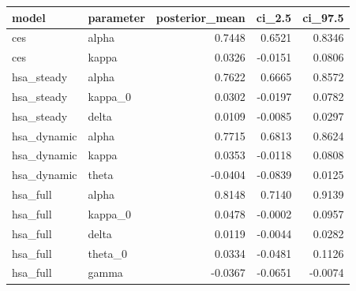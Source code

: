 \begin{tabular}{llrrr}
\toprule
model & parameter & posterior\_mean & ci\_2.5 & ci\_97.5 \\
\midrule
ces & alpha & 0.7448 & 0.6521 & 0.8346 \\
ces & kappa & 0.0326 & -0.0151 & 0.0806 \\
hsa\_steady & alpha & 0.7622 & 0.6665 & 0.8572 \\
hsa\_steady & kappa\_0 & 0.0302 & -0.0197 & 0.0782 \\
hsa\_steady & delta & 0.0109 & -0.0085 & 0.0297 \\
hsa\_dynamic & alpha & 0.7715 & 0.6813 & 0.8624 \\
hsa\_dynamic & kappa & 0.0353 & -0.0118 & 0.0808 \\
hsa\_dynamic & theta & -0.0404 & -0.0839 & 0.0125 \\
hsa\_full & alpha & 0.8148 & 0.7140 & 0.9139 \\
hsa\_full & kappa\_0 & 0.0478 & -0.0002 & 0.0957 \\
hsa\_full & delta & 0.0119 & -0.0044 & 0.0282 \\
hsa\_full & theta\_0 & 0.0334 & -0.0481 & 0.1126 \\
hsa\_full & gamma & -0.0367 & -0.0651 & -0.0074 \\
\bottomrule
\end{tabular}
